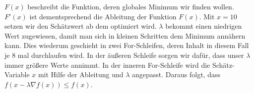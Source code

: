 $F(x)$ beschreibt die Funktion, deren globales Minimum wir finden wollen. $F'(x)$ ist dementsprechend die Ableitung der Funktion $F(x)$. Mit $x=10$ setzen wir den Schätzwert ab dem optimiert wird. $\lambda$ bekommt einen niedrigen Wert zugewiesen, damit man sich in kleinen Schritten dem Minimum annähern kann. Dies wiederum geschieht in zwei For-Schleifen, deren Inhalt in diesem Fall je 8 mal durchlaufen wird. In der äußeren Schleife sorgen wir dafür, dass unser $\lambda$ immer größere Werte annimmt. In der inneren For-Schleife wird die Schätz-Variable $x$ mit Hilfe der Ableitung und $\lambda$ angepasst. Daraus folgt, dass 
 $f(x-\lambda \nabla f(x)) \leq f(x)$.


